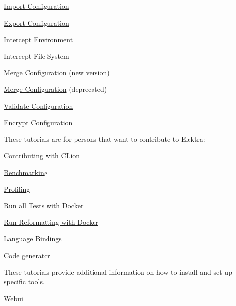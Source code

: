\begin{DoxyItemize}
\item \hyperlink{doc_tutorials_import_md}{Import Configuration}
\item \hyperlink{doc_tutorials_export_md}{Export Configuration}
\item Intercept Environment
\item Intercept File System
\item \hyperlink{doc_tutorials_cmerge_md}{Merge Configuration} (new version)
\item \hyperlink{doc_tutorials_merge_md}{Merge Configuration} (deprecated)
\item \hyperlink{doc_tutorials_validation_md}{Validate Configuration}
\item \hyperlink{doc_tutorials_crypto_md}{Encrypt Configuration}
\end{DoxyItemize}

These tutorials are for persons that want to contribute to Elektra\+:


\begin{DoxyItemize}
\item \hyperlink{doc_tutorials_contributing-clion_md}{Contributing with C\+Lion}
\item \hyperlink{doc_tutorials_benchmarking_md}{Benchmarking}
\item \hyperlink{doc_tutorials_profiling_md}{Profiling}
\item \hyperlink{doc_tutorials_run_all_tests_with_docker_md}{Run all Tests with Docker}
\item \hyperlink{doc_tutorials_run_reformatting_script_with_docker_md}{Run Reformatting with Docker}
\item \hyperlink{doc_tutorials_language-bindings_md}{Language Bindings}
\item \hyperlink{doc_tutorials_code-generator_md}{Code generator}
\end{DoxyItemize}

These tutorials provide additional information on how to install and set up specific tools.


\begin{DoxyItemize}
\item \hyperlink{doc_tutorials_install-webui_md}{Webui} 
\end{DoxyItemize}